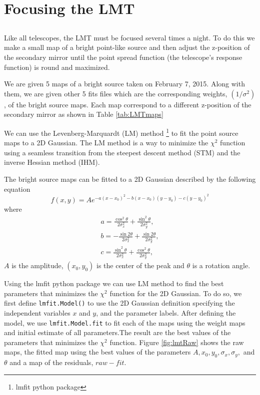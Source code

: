 \section{Focusing the LMT}

\subsection{}
Like all telescopes, the LMT must be focused several times a night.
To do this we make a small map of a bright point-like source and then adjust the z-position of the secondary mirror until the point spread function (the telescope’s response function) is round and maximized. 

We are given 5 maps of a bright source taken on February 7, 2015. Along with them, we are given other 5 fits files which are the corresponding weights, $(1/\sigma^2)$, of the bright source maps. Each map correspond to a different z-position of the secondary mirror as shown in Table \ref{tab:LMTmaps}

We can use the Levenberg-Marquardt (LM) method \footnote{lmfit python package} to fit the point source maps to a 2D Gaussian. The LM method is a way to minimize the $\chi^2$ function using a seamless transition from the steepest descent method (STM) and the inverse Hessian method (IHM).

The bright source maps can be fitted to a 2D Gaussian described by the following equation
\begin{equation}
    f(x,y)=Ae^{-a(x-x_0)^2-b(x-x_0)(y-y_0)-c(y-y_0)^2}
\end{equation}
where 
\begin{align}
    a=\frac{\cos^2\theta}{2\sigma_x^2}+\frac{\sin^2\theta}{2\sigma_y^2},\\
    b=-\frac{\sin 2\theta}{2\sigma_x^2}+\frac{\sin 2\theta}{2\sigma_y^2},\\
    c=\frac{\sin^2\theta}{2\sigma_x^2}+\frac{\cos^2\theta}{2\sigma_y^2},
\end{align}
$A$ is the amplitude, $(x_0,y_0)$ is the center of the peak and $\theta$ is a rotation angle.

Using the lmfit python package we can use LM method to find the best parameters that minimizes the $\chi^2$ function for the 2D Gaussian. To do so, we first define \lstinline{lmfit.Model()} to use the 2D Gaussian definition specifying the independent variables $x$ and $y$, and the parameter labels. After defining the model, we use \lstinline{lmfit.Model.fit} to fit each of the maps using the weight maps and initial estimate of all parameters.The result are the best values of the parameters that minimizes the $\chi^2$ function. 
Figure \ref{fig:lmtRaw} shows the raw maps, the fitted map using the best values of the parameters $A,x_0,y_0,\sigma_x,\sigma_y,$ and $\theta$ and a map of the residuals, $raw-fit$. 

